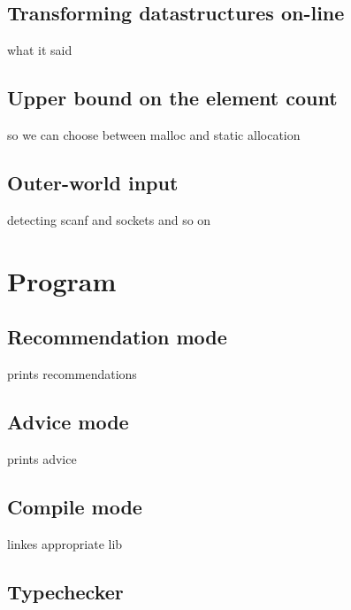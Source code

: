 \documentclass[11pt]{article}
\begin{document}
	\subsection{Transforming datastructures on-line}
		what it said
	\subsection{Upper bound on the element count}
		so we can choose between malloc and static allocation
	\subsection{Outer-world input}
		detecting scanf and sockets and so on

\section{Program}
	\subsection{Recommendation mode}
		prints recommendations 
	\subsection{Advice mode}
		prints advice
	\subsection{Compile mode}
		linkes appropriate lib
	\subsection{Typechecker}
\end{document}
